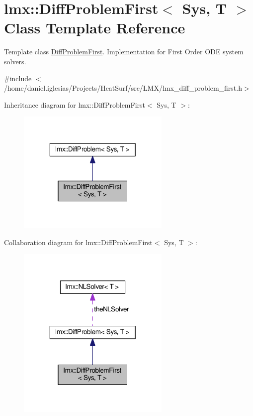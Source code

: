 \hypertarget{classlmx_1_1DiffProblemFirst}{\section{lmx\-:\-:Diff\-Problem\-First$<$ Sys, T $>$ Class Template Reference}
\label{classlmx_1_1DiffProblemFirst}
}


Template class \hyperlink{classlmx_1_1DiffProblemFirst}{Diff\-Problem\-First}. Implementation for First Order O\-D\-E system solvers.  




{\ttfamily \#include $<$/home/daniel.\-iglesias/\-Projects/\-Heat\-Surf/src/\-L\-M\-X/lmx\-\_\-diff\-\_\-problem\-\_\-first.\-h$>$}



Inheritance diagram for lmx\-:\-:Diff\-Problem\-First$<$ Sys, T $>$\-:
\nopagebreak
\begin{figure}[H]
\begin{center}
\leavevmode
\includegraphics[width=208pt]{classlmx_1_1DiffProblemFirst__inherit__graph}
\end{center}
\end{figure}


Collaboration diagram for lmx\-:\-:Diff\-Problem\-First$<$ Sys, T $>$\-:
\nopagebreak
\begin{figure}[H]
\begin{center}
\leavevmode
\includegraphics[width=208pt]{classlmx_1_1DiffProblemFirst__coll__graph}
\end{center}
\end{figure}
